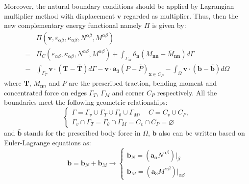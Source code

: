 Moreover, the natural boundary conditions should be applied by Lagrangian multiplier method with displacement $\boldsymbol v$ regarded as multiplier. Thus, then the new complementary energy functional namely $\Pi$ is given by:
\begin{equation} \label{functional}
\begin{split}
&\Pi(\boldsymbol v, \varepsilon_{\alpha\beta},\kappa_{\alpha\beta},N^{\alpha\beta},M^{\alpha\beta}) \\
=&\Pi_C(\varepsilon_{\alpha\beta},\kappa_{\alpha\beta},N^{\alpha\beta},M^{\alpha\beta})
+ \int_{\Gamma_M} \theta_{\boldsymbol n} (M_{\boldsymbol{nn}} - \bar M_{\boldsymbol{nn}}) d\Gamma \\
- &\int_{\Gamma_T} \boldsymbol v \cdot (\boldsymbol T - \bar{\boldsymbol T})d\Gamma - \boldsymbol v \cdot \boldsymbol a_3 (P - \bar{P})_{\boldsymbol x \in C_P}
- \int_\Omega \boldsymbol v \cdot (\boldsymbol b - \bar{\boldsymbol b}) d\Omega 
\end{split}
\end{equation}
where $\bar{\boldsymbol T}$, $\bar M_{\boldsymbol nn}$ and $\bar P$ are the prescribed traction, bending moment and concentrated force on edges $\Gamma_T$, $\Gamma_M$ and corner $C_P$ respectively. All the boundaries meet the following geometric relationships:
\begin{equation}\label{geo}
\begin{cases}
\Gamma=\Gamma_v \cup \Gamma_T \cup \Gamma_\theta \cup \Gamma_M, \quad C = C_v \cup C_P, \\
\Gamma_v \cap \Gamma_T = \Gamma_\theta \cap \Gamma_M = C_v \cap C_P = \varnothing
\end{cases}
\end{equation}
and $\bar{\boldsymbol b}$ stands for the prescribed body force in $\Omega$, $\boldsymbol b$ also can be written based on Euler-Lagrange equations \cite{benzaken2021} as:
\begin{equation}
\boldsymbol b = \boldsymbol b_N + \boldsymbol b_M \rightarrow
\begin{cases}
\boldsymbol b_N = (\boldsymbol a_\alpha N^{\alpha\beta})\vert_\beta \\
\boldsymbol b_M = (\boldsymbol a_3 M^{\alpha\beta})\vert_{\alpha\beta}
\end{cases}
\end{equation}


